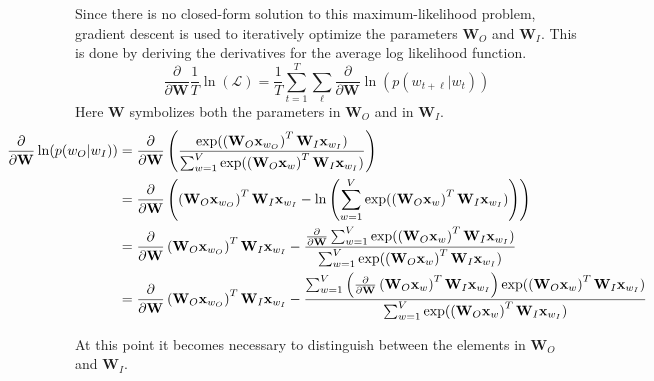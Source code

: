 
Since there is no closed-form solution to this maximum-likelihood problem, gradient descent is used to iteratively optimize the parameters $\mathbf{W}_O$ and $\mathbf{W}_I$. This is done by deriving the derivatives for the average log likelihood function. 
\begin{equation}
\frac{\partial}{\partial \mathbf{W}} \frac{1}{T} \ln( \mathcal{L} ) = \frac{1}{T} \sum_{t = 1}^T \sum_{\ell} \frac{\partial}{\partial \mathbf{W}} \ln( p(w_{t + \ell} | w_t) )
\end{equation}
Here $\mathbf{W}$ symbolizes both the parameters in $\mathbf{W}_O$ and in $\mathbf{W}_I$. 
\begin{equation*}
\centerline{$
\begin{aligned}
\frac{\partial}{\partial \mathbf{W}} \ln( p(w_O | w_I) ) &= \frac{\partial}{\partial \mathbf{W}} 	 \left( \frac{
	\mathrm{exp}( \left( \mathbf{W}_O \mathbf{x}_{w_O} \right)^T \mathbf{W}_I \mathbf{x}_{w_I} )
}{
	\sum_{w=1}^V \mathrm{exp}( \left( \mathbf{W}_O \mathbf{x}_{w} \right)^T \mathbf{W}_I \mathbf{x}_{w_I} )
} \right) \\
&= \frac{\partial}{\partial \mathbf{W}} \left( \left( \mathbf{W}_O \mathbf{x}_{w_O} \right)^T \mathbf{W}_I \mathbf{x}_{w_I} - \ln \left(\sum_{w=1}^V \mathrm{exp}( \left( \mathbf{W}_O \mathbf{x}_{w} \right)^T \mathbf{W}_I \mathbf{x}_{w_I}) \right) \right) \\
&= \frac{\partial}{\partial \mathbf{W}} \left( \mathbf{W}_O \mathbf{x}_{w_O} \right)^T \mathbf{W}_I \mathbf{x}_{w_I} - \frac{
	\frac{\partial}{\partial \mathbf{W}} \sum_{w=1}^V \mathrm{exp}( \left( \mathbf{W}_O \mathbf{x}_{w} \right)^T \mathbf{W}_I \mathbf{x}_{w_I})
} {
	\sum_{w=1}^V \mathrm{exp}( \left( \mathbf{W}_O \mathbf{x}_{w} \right)^T \mathbf{W}_I \mathbf{x}_{w_I})
} \\
&= \frac{\partial}{\partial \mathbf{W}} \left( \mathbf{W}_O \mathbf{x}_{w_O} \right)^T \mathbf{W}_I \mathbf{x}_{w_I} - \frac{
	\sum_{w=1}^V \left(\frac{\partial}{\partial \mathbf{W}} \left(\mathbf{W}_O \mathbf{x}_{w} \right)^T \mathbf{W}_I \mathbf{x}_{w_I} \right) \mathrm{exp}( \left( \mathbf{W}_O \mathbf{x}_{w} \right)^T \mathbf{W}_I \mathbf{x}_{w_I})
} {
	\sum_{w=1}^V \mathrm{exp}( \left( \mathbf{W}_O \mathbf{x}_{w} \right)^T \mathbf{W}_I \mathbf{x}_{w_I})
}
\end{aligned}$}
\end{equation*}

At this point it becomes necessary to distinguish between the elements in $\mathbf{W}_O$ and $\mathbf{W}_I$.

